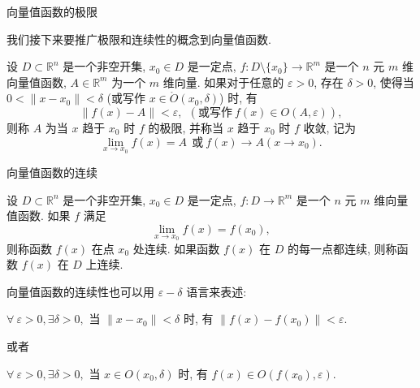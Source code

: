 
\begin{frame}{向量值函数的极限}

我们接下来要推广极限和连续性的概念到向量值函数.

\pause

\begin{Def}[向量值函数的极限]
设 $D \subset \mathbb{R}^n$ 是一个非空开集, $x_0 \in D$ 是一定点, $f: D \setminus \{x_0\} \to \mathbb{R}^m$ 是一个 $n$ 元 $m$ 维向量值函数, $A \in \mathbb{R}^m$ 为一个 $m$ 维向量. 如果对于任意的 $\varepsilon > 0$, 存在 $\delta > 0$, 使得当 $0 < \lVert x - x_0 \rVert < \delta$ (或写作 $x \in \mathring{O}(x_0, \delta)$) 时, 有
\[\lVert f(x) - A \rVert < \varepsilon, ~~ (\text{或写作} ~ f(x) \in O(A, \varepsilon)),\]
则称 $A$ 为当 $x$ 趋于 $x_0$ 时 $f$ 的极限, 并称当 $x$ 趋于 $x_0$ 时 $f$ 收敛, 记为
\[\lim_{x \to x_0} f(x) = A ~~ \text{或} ~ f(x) \to A (x \to x_0).\]
\end{Def}

\end{frame}


\begin{frame}{向量值函数的连续}

\begin{Def}[向量值函数的连续性]
设 $D \subset \mathbb{R}^n$ 是一个非空开集, $x_0 \in D$ 是一定点, $f: D \to \mathbb{R}^m$ 是一个 $n$ 元 $m$ 维向量值函数. 如果 $f$ 满足
\[\lim_{x \to x_0} f(x) = f(x_0),\]
则称函数 $f(x)$ 在点 $x_0$ 处连续.
\pause
如果函数 $f(x)$ 在 $D$ 的每一点都连续, 则称函数 $f(x)$ 在 $D$ 上连续.
\end{Def}

\pause

\begin{remark}
向量值函数的连续性也可以用 $\varepsilon - \delta$ 语言来表述:

\pause

\begin{center}
$\forall~\varepsilon > 0, \exists \delta > 0,$ 当 $\lVert x - x_0 \rVert < \delta$ 时, 有 $\lVert f(x) - f(x_0) \rVert < \varepsilon.$
\end{center}

\pause

或者

\begin{center}
$\forall~\varepsilon > 0, \exists \delta > 0,$ 当 $x \in O(x_0, \delta)$ 时, 有 $f(x) \in O(f(x_0), \varepsilon).$
\end{center}
\end{remark}

\end{frame}

